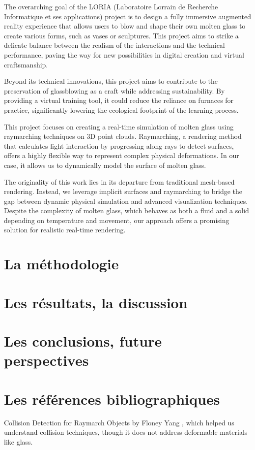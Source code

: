 \documentclass{rapportcs}
\begin{document}
    The overarching goal of the LORIA (Laboratoire Lorrain de Recherche Informatique et ses applications) project is to design a fully immersive augmented reality experience that allows users to blow and shape their own molten glass to create various forms, such as vases or sculptures. This project aims to strike a delicate balance between the realism of the interactions and the technical performance, paving the way for new possibilities in digital creation and virtual craftsmanship.

    Beyond its technical innovations, this project aims to contribute to the preservation of glassblowing as a craft while addressing sustainability. By providing a virtual training tool, it could reduce the reliance on furnaces for practice, significantly lowering the ecological footprint of the learning process.

    This project focuses on creating a real-time simulation of molten glass using raymarching techniques on 3D point clouds. Raymarching, a rendering method that calculates light interaction by progressing along rays to detect surfaces, offers a highly flexible way to represent complex physical deformations. In our case, it allows us to dynamically model the surface of molten glass.

    The originality of this work lies in its departure from traditional mesh-based rendering. Instead, we leverage implicit surfaces and raymarching to bridge the gap between dynamic physical simulation and advanced visualization techniques. Despite the complexity of molten glass, which behaves as both a fluid and a solid depending on temperature and movement, our approach offers a promising solution for realistic real-time rendering.

    \newpage
    \section{La méthodologie}

    \newpage
    \section{Les résultats, la discussion}

    \newpage
    \section{Les conclusions, future perspectives}

    \newpage
    \section{Les références bibliographiques}
   Collision Detection for Raymarch Objects by Floney Yang \cite{yang_raymarching_2024}, which helped us understand collision techniques, though it does not address deformable materials like glass.
\end{document}
